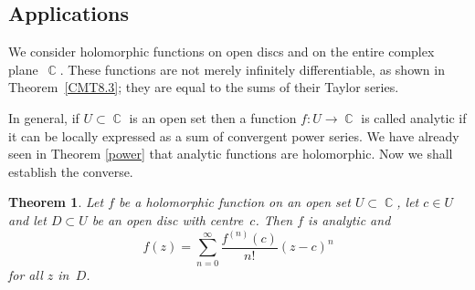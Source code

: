 \documentclass{amsproc}
\newtheorem{theorem}{Theorem}[subsection]
\theoremstyle{definition}
\theoremstyle{remark}
\DeclareMathOperator{\C}{\mathbb{C}}
\numberwithin{equation}{section}
\begin{document}
\vfill\pagebreak


\subsection{Applications} \label{CME9}

We consider holomorphic functions on open discs and on the entire complex plane~$ \C $. These functions are not merely infinitely differentiable, as shown in Theorem~\ref{CMT8.3};
they are equal to the sums of their Taylor series.

In general, if $ U \subset \C $ is an open set then a function $ f: U \to \C $ is called analytic if it can be locally expressed as a sum of convergent power series.
We have already seen in Theorem \ref{power} that analytic functions are holomorphic. Now we shall establish the converse.

\begin{theorem} \label{CMT9.1}
Let $ f $ be a holomorphic function on an open set $ U \subset \C $, let $ c \in U $ and let $ D \subset U $ be an open disc with centre~$ c $.
Then $ f $ is analytic and
$$
f(z) = \sum_{n = 0}^\infty \dfrac{f^{(n)}(c)}{n!}(z - c)^n
$$
for all $ z $ in~$ D $.
\end{theorem}
\end{document}
